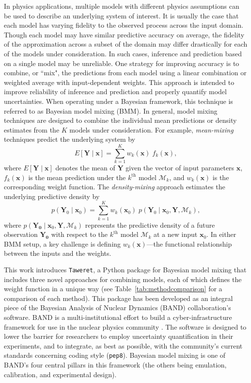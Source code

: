 \documentclass[10pt, preprint,aps,prc,floatfix,
tightenlines,
nofootinbib,superscriptaddress]{revtex4-2}
\newcommand{\M}{\mathcal{M}}
\newcommand{\xvec}{\boldsymbol x}
\begin{document}
In physics applications, multiple models with different physics assumptions can be used to describe an underlying system of interest. It is usually the case that each model has varying fidelity to the observed process across the input domain. Though each model may have similar predictive accuracy on average, the fidelity of the approximation across a subset of the domain may differ drastically for each of the models under consideration. In such cases, inference and prediction based on a single model may be unreliable. One strategy for improving accuracy is to combine, or  ``mix", the predictions from each model using a linear combination or weighted average with input-dependent weights. This approach is intended to improve reliability of inference and prediction and properly quantify model uncertainties. When operating under a Bayesian framework, this technique is referred to as Bayesian model mixing (BMM). In general, model mixing techniques are designed to combine the individual mean predictions or density estimates from the $K$ models under consideration.
For example, \textit{mean-mixing} techniques predict the underlying system by 
\begin{equation}
    E[\bm Y \mid \xvec] = \sum_{k = 1}^K w_k(\xvec)\; f_k(\xvec),
\end{equation}
where $E[\bm Y\mid\xvec]$ denotes the mean of $\bm Y$ given the vector of input parameters $\bm x$, $f_k(\xvec)$ is the mean prediction under the $k^\mathrm{th}$ model $\mathcal{M}_k$, and $w_k(\xvec)$ is the corresponding weight function. The \textit{density-mixing} approach estimates the underlying predictive density by
\begin{equation}
    p(\bm Y_{0} \mid \xvec_{0}) = \sum_{k = 1}^K w_k(\xvec_{0})\;p(\bm Y_{0} \mid \xvec_{0}, \bm{Y}, \M_k),
\end{equation}
where $p(\bm{Y_{0}} \mid \xvec_{0}, \bm{Y}, \M_k)$ represents the predictive density of a future observation $\bm{Y_{0}}$ with respect to the $k^\mathrm{th}$ model $\mathcal{M}_k$ at a new input $\xvec_{0}$. In either BMM setup, a key challenge is defining $w_k(\xvec)$---the functional relationship between the inputs and the weights. 

This work introduces \texttt{Taweret}, a Python package for Bayesian model mixing that includes three novel approaches for combining models, each of which defines the weight function in a unique way (see Table~\ref{tab:methodcomparison} for a comparison of each method). This package has been developed as an integral piece of the Bayesian Analysis of Nuclear Dynamics (BAND) collaboration's software. BAND is a multi-institutional effort to build a cyber-infrastructure framework for use in the nuclear physics community \cite{Phillips:2020dmw, bandframework}. The software is designed to lower the barrier for researchers to employ uncertainty quantification in their experiments, and to integrate, as best as possible, with the community's current standards concerning coding style (\texttt{pep8}). Bayesian model mixing is one of BAND's four central pillars in this framework (the others being emulation, calibration, and experimental design).
\end{document}
